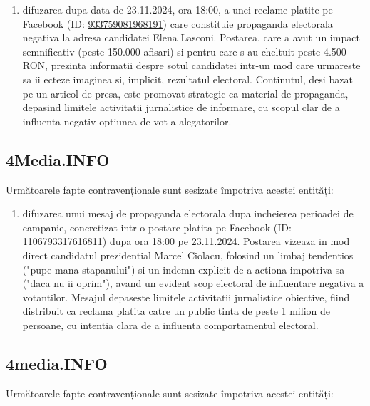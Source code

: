 \documentclass[a4paper,12pt]{article}
\begin{document}
\begin{enumerate}[leftmargin=*, label=\arabic*.)]
    \item difuzarea dupa data de 23.11.2024, ora 18:00, a unei reclame platite pe Facebook (ID: \href{https://www.facebook.com/ads/library/?id=933759081968191}{933759081968191}) care constituie propaganda electorala negativa la adresa candidatei Elena Lasconi. Postarea, care a avut un impact semnificativ (peste 150.000 afisari) si pentru care s-au cheltuit peste 4.500 RON, prezinta informatii despre sotul candidatei intr-un mod care urmareste sa ii ecteze imaginea si, implicit, rezultatul electoral. Continutul, desi bazat pe un articol de presa, este promovat strategic ca material de propaganda, depasind limitele activitatii jurnalistice de informare, cu scopul clar de a influenta negativ optiunea de vot a alegatorilor.
\end{enumerate}

\vspace{0.5cm}

\subsection{4Media.INFO}
Următoarele fapte contravenționale sunt sesizate împotriva acestei entități:

\begin{enumerate}[leftmargin=*, label=\arabic*.)]
    \item difuzarea unui mesaj de propaganda electorala dupa incheierea perioadei de campanie, concretizat intr-o postare platita pe Facebook (ID: \href{https://www.facebook.com/ads/library/?id=1106793317616811}{1106793317616811}) dupa ora 18:00 pe 23.11.2024. Postarea vizeaza in mod direct candidatul prezidential Marcel Ciolacu, folosind un limbaj tendentios ("pupe mana stapanului") si un indemn explicit de a actiona impotriva sa ("daca nu ii oprim"), avand un evident scop electoral de influentare negativa a votantilor. Mesajul depaseste limitele activitatii jurnalistice obiective, fiind distribuit ca reclama platita catre un public tinta de peste 1 milion de persoane, cu intentia clara de a influenta comportamentul electoral.
\end{enumerate}

\vspace{0.5cm}

\subsection{4media.INFO}
Următoarele fapte contravenționale sunt sesizate împotriva acestei entități:
\end{document}
